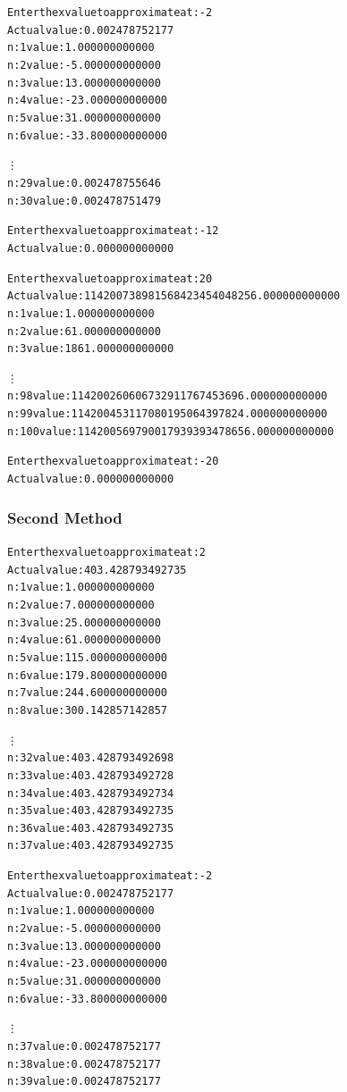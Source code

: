 \documentclass[11pt]{article} %
\begin{document}
\begin{alltt}
Enter the x value to approximate at: -2
Actual value: 0.002478752177 
n: 1	value: 1.000000000000
n: 2	value: -5.000000000000
n: 3	value: 13.000000000000
n: 4	value: -23.000000000000
n: 5	value: 31.000000000000
n: 6	value: -33.800000000000

\vdots
n: 29	value: 0.002478755646
n: 30	value: 0.002478751479
\end{alltt}

\begin{alltt}
Enter the x value to approximate at: -12
Actual value: 0.000000000000 
\end{alltt}

\begin{alltt}
Enter the x value to approximate at: 20
Actual value: 114200738981568423454048256.000000000000 
n: 1	value: 1.000000000000
n: 2	value: 61.000000000000
n: 3	value: 1861.000000000000

\vdots
n: 98	value: 114200260606732911767453696.000000000000
n: 99	value: 114200453117080195064397824.000000000000
n: 100	value: 114200569790017939393478656.000000000000
\end{alltt}

\begin{alltt}
Enter the x value to approximate at: -20
Actual value: 0.000000000000 
\end{alltt}


\subsubsection*{Second Method}

\begin{alltt}
Enter the x value to approximate at: 2
Actual value: 403.428793492735 
n: 1	value: 1.000000000000
n: 2	value: 7.000000000000
n: 3	value: 25.000000000000
n: 4	value: 61.000000000000
n: 5	value: 115.000000000000
n: 6	value: 179.800000000000
n: 7	value: 244.600000000000
n: 8	value: 300.142857142857

\vdots
n: 32	value: 403.428793492698
n: 33	value: 403.428793492728
n: 34	value: 403.428793492734
n: 35	value: 403.428793492735
n: 36	value: 403.428793492735
n: 37	value: 403.428793492735
\end{alltt}

\begin{alltt}
Enter the x value to approximate at: -2
Actual value: 0.002478752177 
n: 1	value: 1.000000000000
n: 2	value: -5.000000000000
n: 3	value: 13.000000000000
n: 4	value: -23.000000000000
n: 5	value: 31.000000000000
n: 6	value: -33.800000000000

\vdots
n: 37	value: 0.002478752177
n: 38	value: 0.002478752177
n: 39	value: 0.002478752177
\end{alltt}
\end{document}

